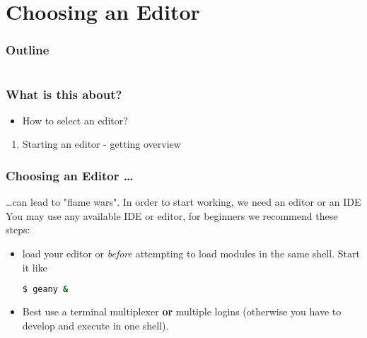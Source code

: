 \section{Choosing an Editor}

\begin{frame}
	\frametitle{Outline}
	\begin{columns}[t]
		\begin{column}{.5\textwidth}
			\tableofcontents[sections={1-9},currentsection]
		\end{column}
		\begin{column}{.5\textwidth}
			\tableofcontents[sections={10-18},currentsection]
		\end{column}
	\end{columns}
\end{frame}

\begin{frame}
	\frametitle{What is this about?}
	\begin{question}
		\begin{itemize}
			\item How to select an editor?
		\end{itemize}
	\end{question}
	\begin{docs}[Objectives]
		\begin{enumerate}
			\item Starting an editor - getting overview
		\end{enumerate}
	\end{docs}
\end{frame}

\begin{frame}[fragile]
	\frametitle{Choosing an Editor \ldots}
	\ldots can lead to "flame wars". In order to start working, we need an editor or an IDE \pause\newline
	You may use any available IDE or editor, for beginners we recommend these steps:
	\begin{itemize}[<+->]
		\item load your editor  or  \emph{before} attempting to load modules in the same shell. Start it like
		\begin{lstlisting}[language=Bash, style=Shell]
$ geany & 
		\end{lstlisting}
		\item Best use a terminal multiplexer \textbf{or} multiple logins (otherwise you have to develop and execute in one shell).
	\end{itemize}
\end{frame}
